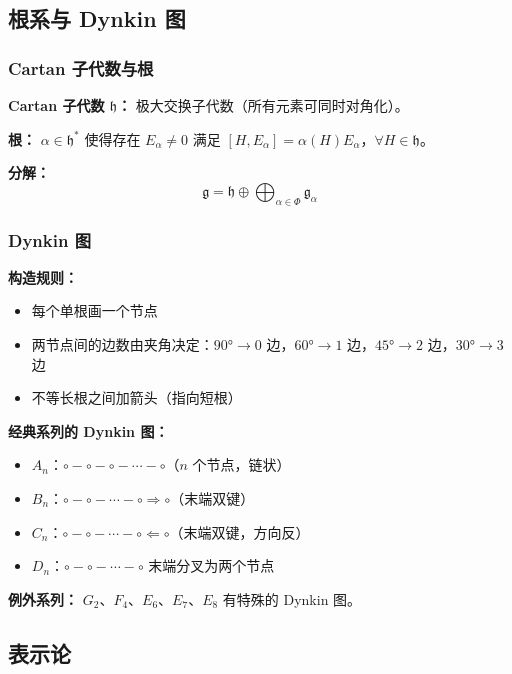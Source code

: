 \subsection{根系与 Dynkin 图}

\subsubsection{Cartan 子代数与根}

\textbf{Cartan 子代数 $\mathfrak{h}$：} 极大交换子代数（所有元素可同时对角化）。

\textbf{根：} $\alpha \in \mathfrak{h}^*$ 使得存在 $E_\alpha \neq 0$ 满足 $[H, E_\alpha] = \alpha(H)E_\alpha$，$\forall H \in \mathfrak{h}$。

\textbf{分解：}
\[
\mathfrak{g} = \mathfrak{h} \oplus \bigoplus_{\alpha \in \Phi} \mathfrak{g}_\alpha
\]

\subsubsection{Dynkin 图}

\textbf{构造规则：}
\begin{itemize}
  \item 每个单根画一个节点
  \item 两节点间的边数由夹角决定：$90° \to 0$ 边，$60° \to 1$ 边，$45° \to 2$ 边，$30° \to 3$ 边
  \item 不等长根之间加箭头（指向短根）
\end{itemize}

\textbf{经典系列的 Dynkin 图：}

\begin{itemize}
  \item $A_n$：$\circ - \circ - \circ - \cdots - \circ$（$n$ 个节点，链状）
  \item $B_n$：$\circ - \circ - \cdots - \circ \Rightarrow \circ$（末端双键）
  \item $C_n$：$\circ - \circ - \cdots - \circ \Leftarrow \circ$（末端双键，方向反）
  \item $D_n$：$\circ - \circ - \cdots - \circ$ 末端分叉为两个节点
\end{itemize}

\textbf{例外系列：} $G_2$、$F_4$、$E_6$、$E_7$、$E_8$ 有特殊的 Dynkin 图。

\subsection{表示论}


